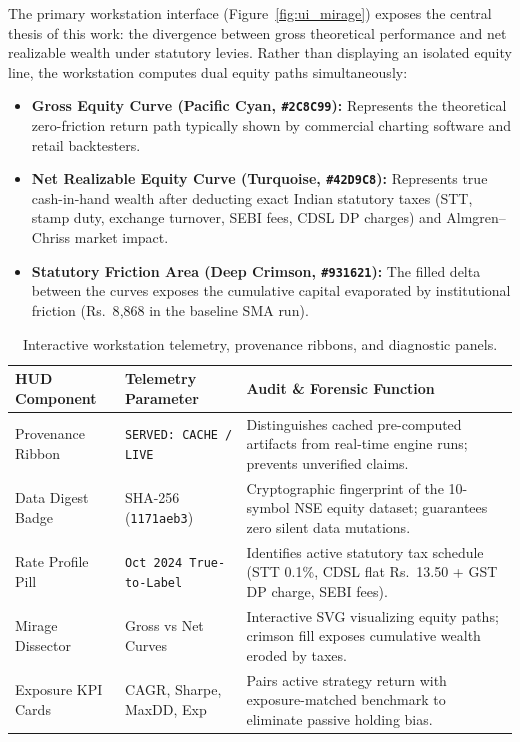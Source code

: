 \documentclass[12pt,a4paper,oneside]{report}
\newcommand{\rupee}{Rs.\ }
\begin{document}
The primary workstation interface (Figure~\ref{fig:ui_mirage}) exposes the central thesis of this work: the divergence between gross theoretical performance and net realizable wealth under statutory levies. Rather than displaying an isolated equity line, the workstation computes dual equity paths simultaneously:
\begin{itemize}[leftmargin=1.2cm]
    \item \textbf{Gross Equity Curve (Pacific Cyan, \texttt{\#2C8C99}):} Represents the theoretical zero-friction return path typically shown by commercial charting software and retail backtesters.
    \item \textbf{Net Realizable Equity Curve (Turquoise, \texttt{\#42D9C8}):} Represents true cash-in-hand wealth after deducting exact Indian statutory taxes (STT, stamp duty, exchange turnover, SEBI fees, CDSL DP charges) and Almgren--Chriss market impact.
    \item \textbf{Statutory Friction Area (Deep Crimson, \texttt{\#931621}):} The filled delta between the curves exposes the cumulative capital evaporated by institutional friction (\rupee 8{,}868 in the baseline SMA run).
\end{itemize}

\begin{table}[htbp]
\centering
\small
\caption[Interactive Workstation Telemetry and Diagnostic Architecture]{Interactive workstation telemetry, provenance ribbons, and diagnostic panels.}
\label{tab:ui_telemetry}
\begin{tabular}{@{}p{3.2cm}p{3.8cm}p{6.8cm}@{}}
\toprule
\textbf{HUD Component} & \textbf{Telemetry Parameter} & \textbf{Audit \& Forensic Function} \\
\midrule
Provenance Ribbon & \texttt{SERVED: CACHE / LIVE} & Distinguishes cached pre-computed artifacts from real-time engine runs; prevents unverified claims. \\
Data Digest Badge & SHA-256 (\texttt{1171aeb3}) & Cryptographic fingerprint of the 10-symbol NSE equity dataset; guarantees zero silent data mutations. \\
Rate Profile Pill & \texttt{Oct 2024 True-to-Label} & Identifies active statutory tax schedule (STT 0.1\%, CDSL flat \rupee 13.50 + GST DP charge, SEBI fees). \\
Mirage Dissector & Gross vs Net Curves & Interactive SVG visualizing equity paths; crimson fill exposes cumulative wealth eroded by taxes. \\
Exposure KPI Cards & CAGR, Sharpe, MaxDD, Exp & Pairs active strategy return with exposure-matched benchmark to eliminate passive holding bias. \\
\bottomrule
\end{tabular}
\end{table}
\end{document}
